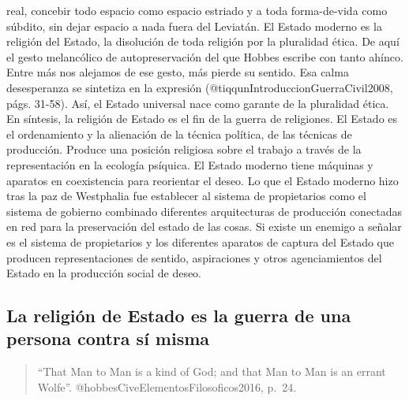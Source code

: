 \documentclass[
]{article}
\begin{document}
real, concebir todo espacio como espacio estriado y a toda forma-de-vida
como súbdito, sin dejar espacio a nada fuera del Leviatán. El Estado
moderno es la religión del Estado, la disolución de toda religión por la
pluralidad ética. De aquí el gesto melancólico de autopreservación del
que Hobbes escribe con tanto ahínco. Entre más nos alejamos de ese
gesto, más pierde su sentido. Esa calma desesperanza se sintetiza en la
expresión (@tiqqunIntroduccionGuerraCivil2008, págs. 31-58). Así, el
Estado universal nace como garante de la pluralidad ética. En síntesis,
la religión de Estado es el fin de la guerra de religiones. El Estado es
el ordenamiento y la alienación de la técnica política, de las técnicas
de producción. Produce una posición religiosa sobre el trabajo a través
de la representación en la ecología psíquica. El Estado moderno tiene
máquinas y aparatos en coexistencia para reorientar el deseo. Lo que el
Estado moderno hizo tras la paz de Westphalia fue establecer al sistema
de propietarios como el sistema de gobierno combinado diferentes
arquitecturas de producción conectadas en red para la preservación del
estado de las cosas. Si existe un enemigo a señalar es el sistema de
propietarios y los diferentes aparatos de captura del Estado que
producen representaciones de sentido, aspiraciones y otros
agenciamientos del Estado en la producción social de deseo.

\hypertarget{la-religiuxf3n-de-estado-es-la-guerra-de-una-persona-contra-suxed-misma}{%
\subsection{La religión de Estado es la guerra de una persona contra sí
misma}\label{la-religiuxf3n-de-estado-es-la-guerra-de-una-persona-contra-suxed-misma}}

\begin{quote}
``That Man to Man is a kind of God; and that Man to Man is an errant
Wolfe''. @hobbesCiveElementosFilosoficos2016, p.~24.
\end{quote}
\end{document}
